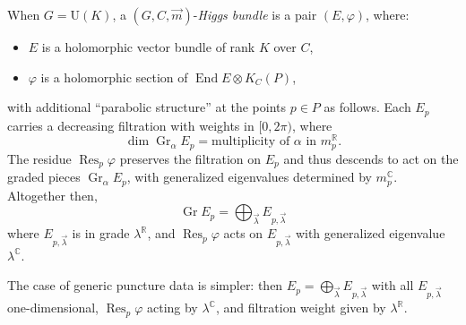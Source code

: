 \documentclass[12pt,letterpaper,reqno]{article}
\numberwithin{equation}{section}
\newcommand{\R}{\ensuremath{\mathbb R}}
\newcommand{\C}{\ensuremath{\mathbb C}}
\newcommand{\de}{\mathrm{d}}
\newcommand{\ti}[1]{\textit{#1}}
\DeclareMathOperator{\End}{End}
\DeclareMathOperator{\Res}{Res}
\DeclareMathOperator{\Gr}{Gr}
\newcommand{\SU}{\mathrm{SU}}
\newcommand{\U}{\mathrm{U}}
\begin{document}
\begin{defn}[Parabolic Higgs bundles for $G = \U(K)$]
When $G = \U(K)$, a $(G, C, \vec m)$-\ti{Higgs bundle} is a pair $(E, \varphi)$, where:
\begin{itemize}
  \item $E$ is a holomorphic vector bundle of rank $K$ over $C$,
  \item $\varphi$ is a holomorphic section of $\End E \otimes K_C(P)$,
\end{itemize}
with additional ``parabolic structure'' at the points $p \in P$
as follows. Each $E_p$ carries a decreasing filtration with weights in $[0,2\pi)$, where 
\begin{equation}
  \dim \Gr_\alpha E_p = \text{multiplicity of $\alpha$ in $m_p^\R$}.
\end{equation}
The residue $\Res_p \varphi$
preserves the filtration on $E_p$ and thus descends to
act on the graded pieces $\Gr_\alpha E_p$, with generalized
eigenvalues determined by $m_p^\C$. Altogether then,
\begin{equation}
 \Gr E_p = \bigoplus_{\vec{\lambda}} E_{p,\vec\lambda}
\end{equation}
where $E_{p,\vec\lambda}$ is in grade $\lambda^\R$, and 
$\Res_p \varphi$ acts on $E_{p,\vec\lambda}$
with generalized eigenvalue $\lambda^\C$.
\end{defn}


\begin{remark}
The case of generic puncture data is simpler:
then $E_p = \bigoplus_{\vec\lambda} E_{p,\vec\lambda}$
with all $E_{p,\vec\lambda}$ one-dimensional, $\Res_p \varphi$ 
acting by $\lambda^\C$, and filtration weight given by $\lambda^\R$.
\end{remark}
\end{document}
